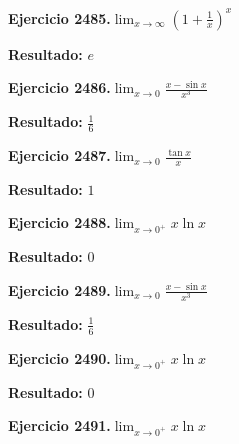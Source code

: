 \documentclass[10pt,a4paper]{article}
\begin{document}
\begin{ejbox}
\textbf{Ejercicio 2485.}\quad $\lim_{x\to \infty} \left(1+\frac{1}{x}\right)^x$
\end{ejbox}

\begin{solbox}
\textbf{Resultado:} \(\displaystyle e\)
\end{solbox}

\begin{ejbox}
\textbf{Ejercicio 2486.}\quad $\lim_{x\to 0} \frac{x-\sin x}{x^3}$
\end{ejbox}

\begin{solbox}
\textbf{Resultado:} \(\displaystyle \frac{1}{6}\)
\end{solbox}

\newpage
\begin{ejbox}
\textbf{Ejercicio 2487.}\quad $\lim_{x\to 0} \frac{\tan x}{x}$
\end{ejbox}

\begin{solbox}
\textbf{Resultado:} \(\displaystyle 1\)
\end{solbox}

\begin{ejbox}
\textbf{Ejercicio 2488.}\quad $\lim_{x\to 0^+} x\ln x$
\end{ejbox}

\begin{solbox}
\textbf{Resultado:} \(\displaystyle 0\)
\end{solbox}

\begin{ejbox}
\textbf{Ejercicio 2489.}\quad $\lim_{x\to 0} \frac{x-\sin x}{x^3}$
\end{ejbox}

\begin{solbox}
\textbf{Resultado:} \(\displaystyle \frac{1}{6}\)
\end{solbox}

\newpage
\begin{ejbox}
\textbf{Ejercicio 2490.}\quad $\lim_{x\to 0^+} x\ln x$
\end{ejbox}

\begin{solbox}
\textbf{Resultado:} \(\displaystyle 0\)
\end{solbox}

\begin{ejbox}
\textbf{Ejercicio 2491.}\quad $\lim_{x\to 0^+} x\ln x$
\end{ejbox}
\end{document}
